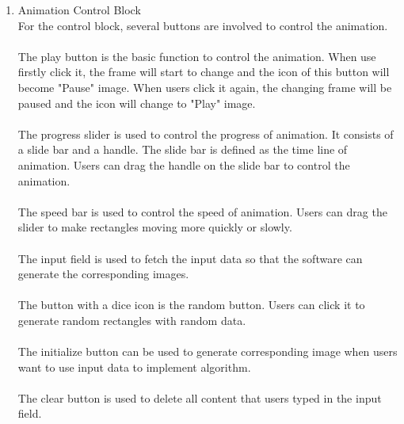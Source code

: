 \documentclass[paper=a4, fontsize=11pt,twoside]{scrartcl}		%
\begin{document}
\begin{enumerate}
\item Animation Control Block \\
For the control block, several buttons are involved to control the animation. \\\\
 The play button is the basic function to control the animation. When use firstly click it, the frame will start to change and the icon of this button will become "Pause" image. When users click it again, the changing frame will be paused and the icon will change to "Play" image. \\\\
 The progress slider is used to control the progress of animation. It consists of a slide bar and a handle. The slide bar is defined as the time line of animation. Users can drag the handle on the slide bar to control the animation.  \\\\
 The speed bar is used to control the speed of animation. Users can drag the slider to make rectangles moving more quickly or slowly.  \\\\
 The input field is used to fetch the input data so that the software can generate the corresponding images. \\\\
 The button with a dice icon is the random button. Users can click it to generate random rectangles with random data.  \\\\
 The initialize button can be used to generate corresponding image when users want to use input data to implement algorithm.  \\\\
 The clear button is used to delete all content that users typed in the input field.  \\\\



\end{enumerate}
\end{document}
